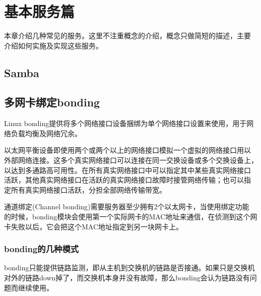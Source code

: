 \part{基本服务篇}

本章介绍几种常见的服务。这里不注重概念的介绍，概念只做简短的描述，主要
介绍如何实施及实现这些服务。











\chapter{Samba}







% 

\chapter{多网卡绑定bonding}

Linux bonding提供将多个网络接口设备捆绑为单个网络接口设置来使用，用于网
络负载均衡及网络冗余。

以太网平衡设备即使用两个或两个以上的网络接口模拟一个虚拟的网络接口用以
外部网络连接。这多个真实网络接口可以连接在同一交换设备或多个交换设备上，
以达到多通路高可用性。在所有真实网络接口中可以指定其中某些真实网络接口
活跃，其他真实网络接口在活跃的真实网络接口故障时接管网络传输；也可以指
定所有真实网络接口活跃，分担全部网络传输带宽。
 
通道绑定(Channel bonding)需要服务器至少拥有2个以太网卡，当使用绑定功能
的时候，bonding模块会使用第一个实际网卡的MAC地址来通信，在侦测到这个网
卡失败以后，它会把这个MAC地址指定到另一块网卡上。

\section{bonding的几种模式}

bonding只能提供链路监测，即从主机到交换机的链路是否接通。如果只是交换机
对外的链路down掉了，而交换机本身并没有故障，那么bonding会认为链路没有问
题而继续使用。
 
